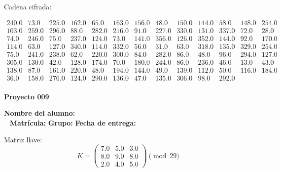 \documentclass[12pt]{article}
\begin{document}
Cadena cifrada:
\begin{center}
$\begin{array}{lllllllllllll}
240.0 & 73.0 & 225.0 & 162.0 & 65.0 & 163.0 & 156.0 & 48.0 & 150.0 & 144.0 & 58.0 & 148.0 & 254.0\\
103.0 & 259.0 & 296.0 & 88.0 & 282.0 & 216.0 & 91.0 & 227.0 & 330.0 & 131.0 & 337.0 & 72.0 & 28.0\\
74.0 & 246.0 & 75.0 & 237.0 & 124.0 & 73.0 & 141.0 & 356.0 & 126.0 & 352.0 & 144.0 & 92.0 & 170.0\\
114.0 & 63.0 & 127.0 & 340.0 & 114.0 & 332.0 & 56.0 & 31.0 & 63.0 & 318.0 & 135.0 & 329.0 & 254.0\\
75.0 & 241.0 & 238.0 & 62.0 & 220.0 & 300.0 & 84.0 & 282.0 & 86.0 & 48.0 & 96.0 & 294.0 & 127.0\\
305.0 & 130.0 & 42.0 & 128.0 & 174.0 & 70.0 & 180.0 & 244.0 & 86.0 & 236.0 & 46.0 & 13.0 & 43.0\\
138.0 & 87.0 & 161.0 & 220.0 & 48.0 & 194.0 & 144.0 & 49.0 & 139.0 & 112.0 & 50.0 & 116.0 & 184.0\\
36.0 & 158.0 & 276.0 & 124.0 & 290.0 & 136.0 & 47.0 & 135.0 & 306.0 & 98.0 & 292.0\\
\end{array}$
\end{center}

\newpage


\textbf{Proyecto 009}

\textbf{Nombre del alumno:} \underline{\hspace{13cm}}\\\
\vspace{1cm}
\textbf{Matrícula:} \underline{\hspace{4cm}} \hspace{1cm}
\textbf{Grupo:} \underline{\hspace{2cm}}
\textbf{Fecha de entrega:} \underline{\hspace{2cm}}

\medskip

Matriz llave:
\[
K = \begin{pmatrix}
7.0 & 5.0 & 3.0\\
8.0 & 9.0 & 8.0\\
2.0 & 4.0 & 5.0
\end{pmatrix} \pmod{29}
\]
\end{document}
